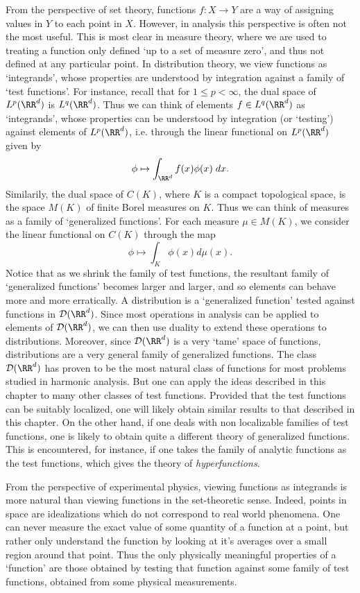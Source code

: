 From the perspective of set theory, functions $f: X \to Y$ are a way of assigning values in $Y$ to each point in $X$. However, in analysis this perspective is often not the most useful. This is most clear in measure theory, where we are used to treating a function only defined `up to a set of measure zero', and thus not defined at any particular point. In distribution theory, we view functions as `integrands', whose properties are understood by integration against a family of `test functions'. For instance, recall that for $1 \leq p < \infty$, the dual space of $L^p(\RR^d)$ is $L^q(\RR^d)$. Thus we can think of elements $f \in L^q(\RR^d)$ as `integrands', whose properties can be understood by integration (or `testing') against elements of $L^p(\RR^d)$, i.e. through the linear functional on $L^p(\RR^d)$ given by
%
\[ \phi \mapsto \int_{\RR^d} f(x) \phi(x)\; dx. \]
%
Similarily, the dual space of $C(K)$, where $K$ is a compact topological space, is the space $M(K)$ of finite Borel measures on $K$. Thus we can think of measures as a family of `generalized functions'. For each measure $\mu \in M(K)$, we consider the linear functional on $C(K)$ through the map
%
\[ \phi \mapsto \int_K \phi(x) d\mu(x). \]
%
Notice that as we shrink the family of test functions, the resultant family of `generalized functions' becomes larger and larger, and so elements can behave more and more erratically. A distribution is a `generalized function' tested against functions in $\mathcal{D}(\RR^d)$. Since most operations in analysis can be applied to elements of $\mathcal{D}(\RR^d)$, we can then use duality to extend these operations to distributions. Moreover, since $\mathcal{D}(\RR^d)$ is a very `tame' space of functions, distributions are a very general family of generalized functions. The class $\mathcal{D}(\RR^d)$ has proven to be the most natural class of functions for most problems studied in harmonic analysis. But one can apply the ideas described in this chapter to many other classes of test functions. Provided that the test functions can be suitably localized, one will likely obtain similar results to that described in this chapter. On the other hand, if one deals with non localizable families of test functions, one is likely to obtain quite a different theory of generalized functions. This is encountered, for instance, if one takes the family of analytic functions as the test functions, which gives the theory of \emph{hyperfunctions}.

\begin{remark}
  From the perspective of experimental physics, viewing functions as integrands is more natural than viewing functions in the set-theoretic sense. Indeed, points in space are idealizations which do not correspond to real world phenomena. One can never measure the exact value of some quantity of a function at a point, but rather only understand the function by looking at it's averages over a small region around that point. Thus the only physically meaningful properties of a `function' are those obtained by testing that function against some family of test functions, obtained from some physical measurements.
\end{remark}

